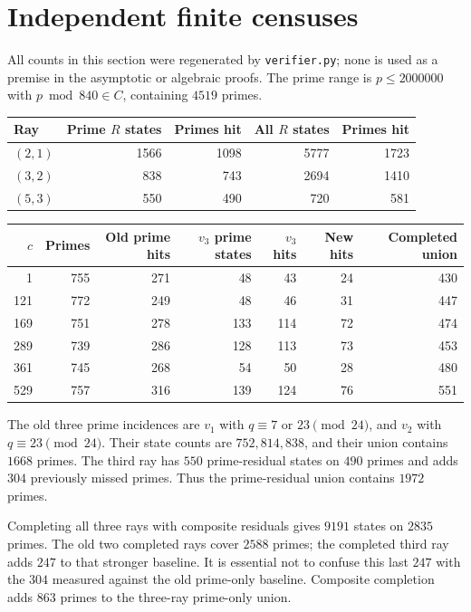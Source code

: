 \documentclass[11pt]{article}
\theoremstyle{remark}\newtheorem{remark}[theorem]{Remark}
\begin{document}
\section{Independent finite censuses}\label{sec:census}
All counts in this section were regenerated by \texttt{verifier.py}; none is used as a premise in the asymptotic or algebraic proofs. The prime range is $p\le2000000$ with $p\bmod840\in C$, containing $4519$ primes.

\begin{center}
\begin{tabular}{@{}lrrrr@{}}
\toprule
Ray&Prime $R$ states&Primes hit&All $R$ states&Primes hit\\
\midrule
$(2,1)$&1566&1098&5777&1723\\
$(3,2)$&838&743&2694&1410\\
$(5,3)$&550&490&720&581\\
\bottomrule
\end{tabular}
\end{center}
\begin{center}
\small
\begin{tabular}{@{}rrrrrrr@{}}
\toprule
$c$&Primes&Old prime hits&$v_3$ prime states&$v_3$ hits&New hits&Completed union\\
\midrule
1&755&271&48&43&24&430\\
121&772&249&48&46&31&447\\
169&751&278&133&114&72&474\\
289&739&286&128&113&73&453\\
361&745&268&54&50&28&480\\
529&757&316&139&124&76&551\\
\bottomrule
\end{tabular}
\end{center}

The old three prime incidences are $v_1$ with $q\equiv7$ or $23\pmod{24}$, and $v_2$ with $q\equiv23\pmod{24}$. Their state counts are $752,814,838$, and their union contains $1668$ primes. The third ray has $550$ prime-residual states on $490$ primes and adds $304$ previously missed primes. Thus the prime-residual union contains $1972$ primes.

Completing all three rays with composite residuals gives $9191$ states on $2835$ primes. The old two completed rays cover $2588$ primes; the completed third ray adds $247$ to that stronger baseline. It is essential not to confuse this last $247$ with the $304$ measured against the old prime-only baseline. Composite completion adds $863$ primes to the three-ray prime-only union.
\end{document}
